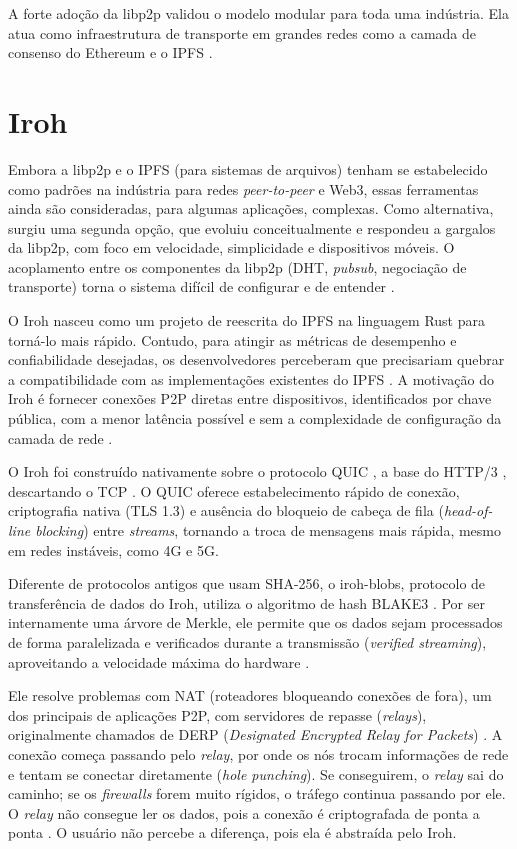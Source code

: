 A forte adoção da libp2p validou o modelo modular para toda uma indústria. Ela atua como infraestrutura de transporte em grandes redes como a camada de consenso do Ethereum \cite{ethp2p} e o IPFS \cite{libp2p}.

\section{Iroh}

Embora a libp2p e o IPFS (para sistemas de arquivos) tenham se estabelecido como padrões na indústria para redes \textit{peer-to-peer} e Web3, essas ferramentas ainda são consideradas, para algumas
aplicações, complexas. Como alternativa, surgiu uma segunda opção, que evoluiu conceitualmente e respondeu a gargalos da libp2p, com foco em velocidade, simplicidade e dispositivos móveis.
O acoplamento entre os componentes da libp2p (DHT, \textit{pubsub}, negociação de transporte) torna o sistema difícil de configurar e de entender \cite{irohfaq}.

O Iroh nasceu como um projeto de reescrita do IPFS na linguagem Rust para torná-lo mais rápido. Contudo, para atingir as métricas de desempenho e confiabilidade desejadas, os
desenvolvedores perceberam que precisariam quebrar a compatibilidade com as implementações existentes do IPFS \cite{irohnewdirection}. A motivação do Iroh é fornecer conexões P2P diretas entre dispositivos, identificados por chave pública, com a
menor latência possível e sem a complexidade de configuração da camada de rede \cite{iroh}.

O Iroh foi construído nativamente sobre o protocolo QUIC \cite{rfc9000}, a base do HTTP/3 \cite{rfc9114}, descartando o TCP \cite{iroh}. O QUIC oferece estabelecimento rápido de conexão, criptografia nativa (TLS 1.3) e ausência do bloqueio de cabeça de fila (\textit{head-of-line blocking}) entre \textit{streams},
tornando a troca de mensagens mais rápida, mesmo em redes instáveis, como 4G e 5G.

Diferente de protocolos antigos que usam SHA-256, o iroh-blobs, protocolo de transferência de dados do Iroh, utiliza o algoritmo de hash BLAKE3 \cite{irohblobs}. Por ser internamente uma árvore de Merkle, ele permite que os dados sejam processados de forma paralelizada e verificados durante a transmissão (\textit{verified streaming}), aproveitando a velocidade
máxima do hardware \cite{blake3}.

Ele resolve problemas com NAT (roteadores bloqueando conexões de fora), um dos principais de aplicações P2P, com servidores de repasse (\textit{relays}), originalmente chamados de DERP (\textit{Designated Encrypted Relay for Packets}) \cite{irohchangelog}. A conexão começa passando pelo \textit{relay}, por onde os nós trocam informações de rede e tentam se conectar diretamente (\textit{hole punching}). Se
conseguirem, o \textit{relay} sai do caminho; se os \textit{firewalls} forem muito rígidos, o tráfego continua passando por ele. O \textit{relay} não consegue ler os dados, pois a conexão é criptografada de ponta a ponta \cite{irohrelay}. O usuário não
percebe a diferença, pois ela é abstraída pelo Iroh.

